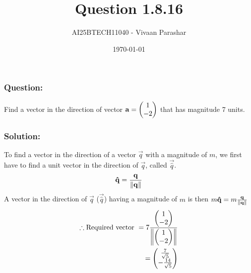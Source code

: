 \documentclass{beamer}
\title{Question 1.8.16}
\author{AI25BTECH11040 - Vivaan Parashar}
\date{\today}
\begin{document}
\frame{\titlepage}

\begin{frame}
    \frametitle{Question: }
    Find a vector in the direction of vector $\mathbf{a} = \begin{pmatrix}1 \\ -2\end{pmatrix}$ that has magnitude 7 units.
\end{frame}

\begin{frame}
    \frametitle{Solution: }
    To find a vector in the direction of a vector $\vec{q}$ with a magnitude of $m$, we first have to find a unit vector in the direction of $\vec{q}$, called $\vec{\hat{q}}$.
    \begin{align}
        \mathbf{\hat{q}} = \frac{\mathbf{q}}{\left\lVert\mathbf{q}\right\rVert}
    \end{align}
    A vector in the direction of $\vec{q}$ ($\vec{\hat{q}}$) having a magnitude of $m$ is then $m \mathbf{\hat{q}} = m\frac{\mathbf{q}}{\left\lVert\mathbf{q}\right\rVert}$
    \begin{align}
        \therefore \text{Required vector } = 7\frac{\begin{pmatrix}1 \\ -2\end{pmatrix}}{\left\lVert\begin{pmatrix}1 \\ -2\end{pmatrix}\right\rVert}\\
        = \begin{pmatrix}\frac{7}{\sqrt{5}}                          \\ - \frac{14}{\sqrt{5}}\end{pmatrix}
    \end{align}

\end{frame}
\end{document}
